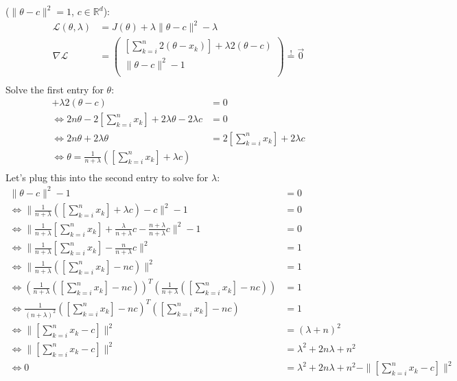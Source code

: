 \documentclass[10pt,a4paper]{article}
\begin{document}
\begin{enumerate}[(a)]
($\|\theta-c\|^2 = 1$, $c \in \mathbb{R}^d$):
\begin{align*}
    \mathcal{L}(\theta,\lambda) &= J(\theta) + \lambda \|\theta - c\|^2 - \lambda \\
    \nabla\mathcal{L} &= \left(
        \begin{array}{c}
            [\sum_{k = i}^{n} 2(\theta-x_k)] + \lambda 2(\theta - c)\\
            \|\theta - c\|^2 - 1\\
        \end{array}
    \right) \overset{!}{=} \vec{0} \\
\end{align*}
Solve the first entry for $\theta$:
\begin{align*}
    [\sum_{k = i}^{n} 2(\theta-x_k)] + \lambda 2(\theta - c) &= 0 \\
    \Leftrightarrow 2n\theta - 2 [\sum_{k = i}^{n}x_k] + 2\lambda \theta - 2\lambda c &= 0 \\
    \Leftrightarrow 2n\theta + 2\lambda \theta &= 2 [\sum_{k = i}^{n}x_k] + 2\lambda c \\
    \Leftrightarrow \theta = \frac{1}{n+\lambda} ([\sum_{k = i}^{n}x_k] + \lambda c)\\ 
\end{align*}
Let's plug this into the second entry to solve for $\lambda$:
\begin{align*}
    \|\theta - c\|^2 - 1 &= 0 \\
    \Leftrightarrow \| \frac{1}{n+\lambda} ([\sum_{k = i}^{n}x_k] + \lambda c) - c\|^2 - 1 &= 0\\
    \Leftrightarrow \| \frac{1}{n+\lambda} [\sum_{k = i}^{n}x_k] + \frac{\lambda}{n+\lambda} c - \frac{n+\lambda}{n+\lambda}c\|^2 - 1 &= 0\\
    \Leftrightarrow \| \frac{1}{n+\lambda} [\sum_{k = i}^{n}x_k] - \frac{n}{n+\lambda} c\|^2 &= 1\\
    \Leftrightarrow \| \frac{1}{n+\lambda} ([\sum_{k = i}^{n}x_k] - n c)\|^2 &= 1\\
    \Leftrightarrow  (\frac{1}{n+\lambda} ([\sum_{k = i}^{n}x_k] - n c))^T (\frac{1}{n+\lambda} ([\sum_{k = i}^{n}x_k] - n c)) &= 1\\
    \Leftrightarrow \frac{1}{(n+\lambda)^2}([\sum_{k = i}^{n}x_k] - n c)^T ([\sum_{k = i}^{n}x_k] - n c) &= 1\\
    \Leftrightarrow \|[\sum_{k = i}^{n}x_k - c]\|^2 &= (\lambda + n)^2\\
    \Leftrightarrow \|[\sum_{k = i}^{n}x_k - c]\|^2 &= \lambda^2 + 2n\lambda +n^2\\
    \Leftrightarrow 0 &= \lambda^2 + 2n\lambda + n^2 - \|[\sum_{k = i}^{n}x_k - c]\|^2
\end{align*}

\end{enumerate}
\end{document}
